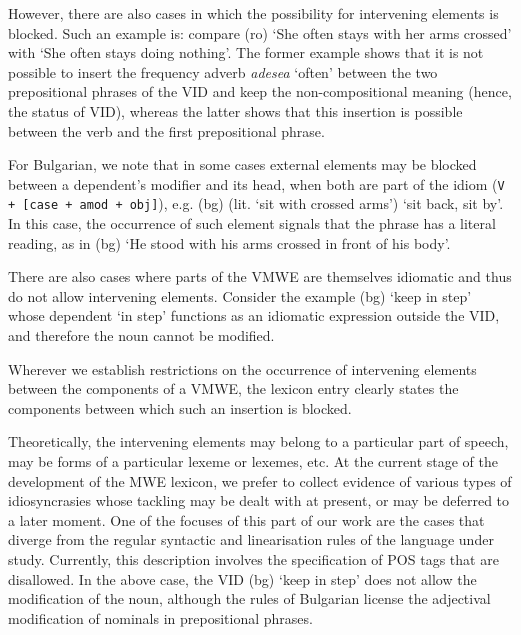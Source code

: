 \documentclass[output=paper,colorlinks,citecolor=brown]{langscibook}
\begin{document}
However, there are also cases in which the possibility for intervening elements is blocked. %
Such an example is: compare (ro)  %
`She often stays with her arms crossed' with  %
`She often stays doing nothing'. The former example shows that it is not possible to insert the frequency adverb \textit{adesea} `often' between the two prepositional phrases of the VID and keep the non-compositional meaning (hence, the status of VID), whereas the latter shows that this insertion is possible between the verb and the first prepositional phrase. 

For Bulgarian, we note that in some cases external elements may be blocked between a dependent's modifier and its head, when both are part of the idiom (\texttt{V + [case + amod + obj]}), e.g. (bg)  (lit. `sit with crossed arms') {`sit back, sit by'}. In this case, the occurrence of such element signals that the phrase has a literal reading, as in (bg)  %
`He stood with his arms crossed in front of his body'.

There are also cases where parts of the VMWE are themselves idiomatic and thus do not allow intervening elements. Consider the example (bg)  {`keep in step'} whose dependent  {`in step'} functions as an idiomatic expression outside the VID, and therefore the noun cannot be modified. 

Wherever we establish restrictions on the occurrence of intervening elements between the components of a VMWE, the lexicon entry clearly states the components between which such an insertion is blocked.

Theoretically, the intervening elements may belong to a particular part of speech, may be forms of a particular lexeme or lexemes, etc. At the current stage of the development of the MWE lexicon, we prefer to collect evidence of various types of idiosyncrasies whose tackling may be dealt with at present, or may be deferred to a later moment. One of the focuses of this part of our work are the cases that diverge from the regular syntactic and linearisation rules of the language under study. Currently, this description involves the specification of POS tags that are disallowed. In the above case, the VID (bg)  {`keep in step'} does not allow the modification of the noun, although the rules of Bulgarian license the adjectival modification of nominals in prepositional phrases. %
\end{document}
